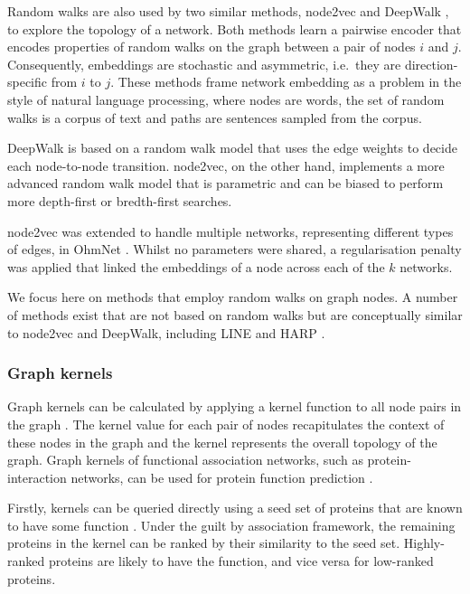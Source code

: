Random walks are also used by two similar methods, node2vec \cite{Grover2016} and DeepWalk \cite{Perozzi2014}, to explore the topology of a network. Both methods learn a pairwise encoder that encodes properties of random walks on the graph between a pair of nodes $i$ and $j$. Consequently, embeddings are stochastic and asymmetric, i.e.~they are direction-specific from $i$ to $j$. These methods frame network embedding as a problem in the style of natural language processing, where nodes are words, the set of random walks is a corpus of text and paths are sentences sampled from the corpus.

DeepWalk is based on a random walk model that uses the edge weights to decide each node-to-node transition. node2vec, on the other hand, implements a more advanced random walk model that is parametric and can be biased to perform more depth-first or bredth-first searches.

node2vec was extended to handle multiple networks, representing different types of edges, in OhmNet \cite{Zitnik2017}. Whilst no parameters were shared, a regularisation penalty was applied that linked the embeddings of a node across each of the $k$ networks.

We focus here on methods that employ random walks on graph nodes. A number of methods exist that are not based on random walks but are conceptually similar to node2vec and DeepWalk, including LINE \cite{Tang2015} and HARP \cite{Chen2018a}.

\subsubsection{Graph kernels}
\label{sec:intro-graph-kernel}

Graph kernels can be calculated by applying a kernel function to all node pairs in the graph \cite{Fouss2012}. The kernel value for each pair of nodes recapitulates the context of these nodes in the graph and the kernel represents the overall topology of the graph. Graph kernels of functional association networks, such as protein-interaction networks, can be used for protein function prediction \cite{Heriche2014,Lehtinen2015}.

Firstly, kernels can be queried directly using a seed set of proteins that are known to have some function \cite{Lehtinen2015}. Under the guilt by association framework, the remaining proteins in the kernel can be ranked by their similarity to the seed set. Highly-ranked proteins are likely to have the function, and vice versa for low-ranked proteins.

